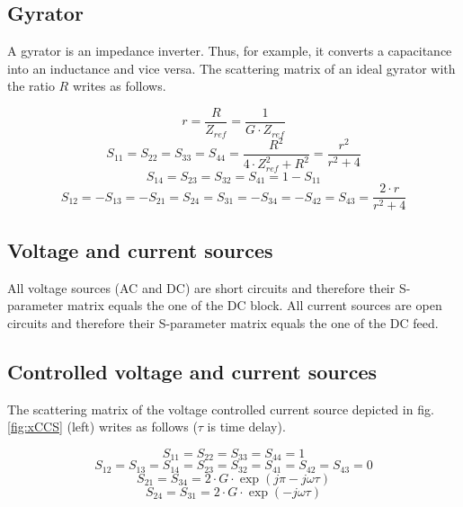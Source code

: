 \documentclass[10pt]{report}
\begin{document}
\subsection{Gyrator}

A gyrator is an impedance inverter.  Thus, for example, it converts a
capacitance into an inductance and vice versa.  The scattering matrix
of an ideal gyrator with the ratio $R$ writes as follows.

\begin{equation}
r = \frac{R}{Z_{ref}} = \frac{1}{G\cdot Z_{ref}}
\end{equation}
\begin{equation}
S_{11} = S_{22} = S_{33} = S_{44} = \frac{R^2}{4\cdot Z_{ref}^2 + R^2} = \frac{r^2}{r^2+4}
\end{equation}
\begin{equation}
S_{14} = S_{23} = S_{32} = S_{41} = 1-S_{11}
\end{equation}
\begin{equation}
S_{12} = -S_{13} = -S_{21} = S_{24} = S_{31} = -S_{34} = -S_{42} = S_{43} = \frac{2\cdot r}{r^2+4}
\end{equation}

\subsection{Voltage and current sources}

All voltage sources (AC and DC) are short circuits and therefore their
S-parameter matrix equals the one of the DC block.  All current
sources are open circuits and therefore their S-parameter matrix
equals the one of the DC feed.

\subsection{Controlled voltage and current sources}

The scattering matrix of the voltage controlled current source
depicted in fig. \ref{fig:xCCS} (left) writes as follows ($\tau$ is
time delay).

\begin{equation}
S_{11} = S_{22} = S_{33} = S_{44} = 1
\end{equation}
\begin{equation}
S_{12} = S_{13} = S_{14} = S_{23} = S_{32} = S_{41} = S_{42} = S_{43} = 0
\end{equation}
\begin{equation}
S_{21} = S_{34} = 2\cdot G\cdot \exp(j\pi-j\omega\tau)
\end{equation}
\begin{equation}
S_{24} = S_{31} = 2\cdot G\cdot \exp(-j\omega\tau)
\end{equation}
\end{document}
